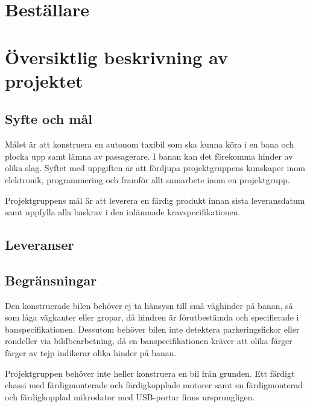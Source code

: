 \documentclass[projektplan/plan.tex]{subfiles}
\begin{document}
\section{Beställare}

\section{Översiktlig beskrivning av projektet}
\subsection{Syfte och mål}
Målet är att konstruera en autonom taxibil som ska kunna köra i en bana och
plocka upp samt lämna av passagerare. I banan kan det förekomma hinder av olika
slag. Syftet med uppgiften är att fördjupa projektgruppens kunskaper inom
elektronik, programmering och framför allt samarbete inom en projektgrupp.

Projektgruppens mål är att leverera en färdig produkt innan sista leveransdatum
samt uppfylla alla baskrav i den inlämnade kravspecifikationen.
\subsection{Leveranser}
\subsection{Begränsningar}
Den konstruerade bilen behöver ej ta hänsysn till små väghinder på banan, så
som låga vägkanter eller gropar, då hindren är förutbestämda och specifierade
i banspecifikationen. Dessutom behöver bilen inte detektera parkeringsfickor
eller rondeller via bildbearbetning, då en banspecifikationen kräver att olika
färger färger av tejp indikerar olika hinder på banan.

Projektgruppen behöver inte heller konstruera en bil från grunden. Ett färdigt
chassi med färdigmonterade och färdigkopplade motorer samt en färdigmonterad
och färdigkopplad mikrodator med USB-portar finns ursprungligen.
\end{document}

